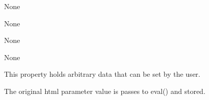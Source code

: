 \documentclass[letterpaper,10pt,english]{sphinxmanual}
\begin{document}
\begin{fulllineitems}

\begin{fulllineitems}
\label{api:qwt.Plot.set_element_data}
None

\end{fulllineitems}


\begin{fulllineitems}
\label{api:qwt.Plot.set_element_properties}
None

\end{fulllineitems}


\begin{fulllineitems}
\label{api:qwt.Plot.set_plot_properties}
None

\end{fulllineitems}


\begin{fulllineitems}
\label{api:qwt.Plot.update}
None

\end{fulllineitems}


\begin{fulllineitems}
\label{api:qwt.Plot.user}
This property holds arbitrary data that can be set by the user.

The original html parameter value is passes to eval() and stored.

\end{fulllineitems}


\end{fulllineitems}

\end{document}
